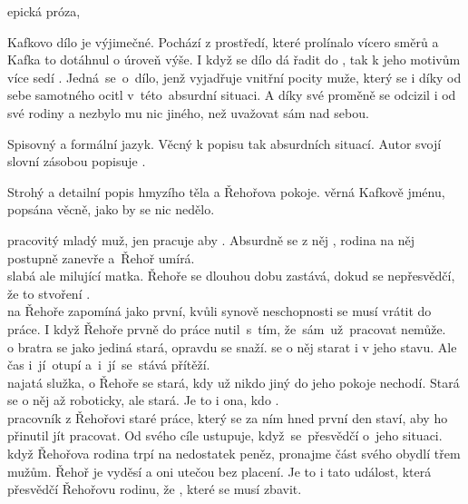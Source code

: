 \documentclass{extarticle} %
\begin{document}

\noindent epická próza, 

\noindent Kafkovo dílo je výjimečné.
Pochází z prostředí, které prolínalo vícero směrů a Kafka to dotáhnul o úroveň výše.
I když se dílo dá řadit do , tak k jeho motivům více sedí .
Jedná~se~o~dílo, jenž vyjadřuje vnitřní pocity muže,
který se i díky  od sebe samotného ocitl v~této~absurdní situaci.
A díky své proměně se odcizil i od své rodiny a nezbylo mu nic jiného, než uvažovat sám nad sebou.

\noindent Spisovný a formální jazyk.
Věcný k popisu tak absurdních situací.
Autor svojí slovní zásobou popisuje .



\noindent Strohý a detailní popis hmyzího těla a Řehořova pokoje.
 věrná Kafkově jménu, popsána věcně, jako by se nic nedělo.

\noindent 
{} pracovitý mladý muž,
jen pracuje aby .
Absurdně se z něj ,
rodina na něj postupně zanevře a~Řehoř umírá. \\
 slabá ale milující matka.
Řehoře se dlouhou dobu zastává, dokud se nepřesvědčí,
že to stvoření . \\
 na Řehoře zapomíná jako první,
kvůli synově neschopnosti se musí vrátit do práce.
I když Řehoře prvně do práce nutil~s~tím, že~sám~už~pracovat nemůže. \\
 o bratra se jako jediná stará, opravdu se snaží.
 se o něj starat i v jeho stavu.
Ale čas i~jí~otupí a~i~jí~se~stává přítěží. \\
 najatá služka, o Řehoře se stará,
kdy už nikdo jiný do jeho pokoje nechodí.
Stará se o něj až roboticky, ale stará.
Je to i ona, kdo . \\
 pracovník z Řehořovi staré práce,
který se za ním hned první den staví, aby ho přinutil jít pracovat.
Od svého cíle ustupuje, když~se~přesvědčí o~jeho situaci. \\
 když Řehořova rodina trpí na nedostatek peněz,
pronajme část svého obydlí třem mužům.
Řehoř je vyděsí a oni utečou bez placení.
Je to i tato událost, která přesvědčí Řehořovu rodinu,
že , které se musí zbavit.
\end{document}
